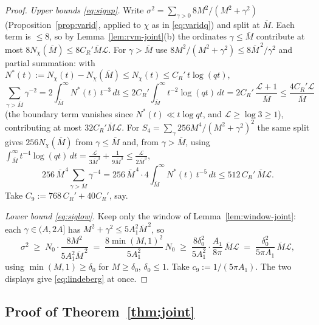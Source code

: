 \documentclass[11pt]{article}
\begin{document}
\begin{proof}
\emph{Upper bounds \eqref{eq:sigup}.} Write
$\sigma^2=\sum_{\gamma>0}8M^2/(M^2+\gamma^2)$
(Proposition~\ref{prop:varid}, applied to $\chi$ as in
\eqref{eq:varidq}) and split at $\overline M$. Each term is $\le8$, so
by Lemma~\ref{lem:rvm-joint}(b) the ordinates $\gamma\le\overline M$
contribute at most $8N_\chi(\overline M)\le8C_R'\overline M\mathcal L$.
For $\gamma>\overline M$ use $8M^2/(M^2+\gamma^2)\le8\overline
M^{\,2}/\gamma^2$ and partial summation: with
$N^*(t):=N_\chi(t)-N_\chi(\overline M)\le N_\chi(t)\le
C_R'\,t\log(qt)$,
\[
\sum_{\gamma>\overline M}\gamma^{-2}
=2\int_{\overline M}^\infty N^*(t)\,t^{-3}\,dt
\le2C_R'\int_{\overline M}^\infty t^{-2}\log(qt)\,dt
=2C_R'\,\frac{\mathcal L+1}{\overline M}
\le\frac{4C_R'\mathcal L}{\overline M}
\]
(the boundary term vanishes since $N^*(t)\ll t\log qt$, and
$\mathcal L\ge\log3\ge1$), contributing at most
$32C_R'\overline M\mathcal L$. For $S_4=\sum_\gamma256M^4/(M^2+\gamma^2)^2$
the same split gives $256N_\chi(\overline M)$ from
$\gamma\le\overline M$ and, from $\gamma>\overline M$, using
$\int_{\overline M}^\infty t^{-4}\log(qt)\,dt
=\tfrac{\mathcal L}{3\overline M^{3}}+\tfrac{1}{9\overline M^{3}}
\le\tfrac{\mathcal L}{2\overline M^{3}}$,
\[
256\,\overline M^{\,4}\sum_{\gamma>\overline M}\gamma^{-4}
=256\,\overline M^{\,4}\cdot4\int_{\overline M}^\infty
N^*(t)\,t^{-5}\,dt
\le512\,C_R'\,\overline M\mathcal L .
\]
Take $C_9:=768\,C_R'+40C_R'$, say.

\emph{Lower bound \eqref{eq:siglow}.} Keep only the window of
Lemma~\ref{lem:window-joint}: each $\gamma\in(A,2A]$ has
$M^2+\gamma^2\le5A_1^2\overline M^{\,2}$, so
\[
\sigma^2\;\ge\;N_0\cdot\frac{8M^2}{5A_1^2\overline M^{\,2}}
\;=\;\frac{8\min(M,1)^2}{5A_1^2}\,N_0
\;\ge\;\frac{8\delta_0^{2}}{5A_1^2}\cdot
\frac{A_1}{8\pi}\,\overline M\mathcal L
\;=\;\frac{\delta_0^{2}}{5\pi A_1}\,\overline M\mathcal L ,
\]
using $\min(M,1)\ge\delta_0$ for $M\ge\delta_0$, $\delta_0\le1$. Take
$c_9:=1/(5\pi A_1)$. The two displays give
\eqref{eq:lindeberg} at once.
\end{proof}

\subsection*{Proof of Theorem~\ref{thm:joint}}
\end{document}
